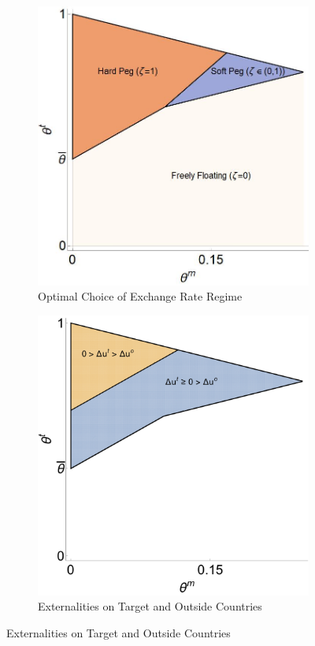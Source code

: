 \begin{figure}
  \begin{minipage}{\linewidth}
    \begin{centering}
      \caption{Optimal Stabilizations}\label{fig_optimal}
      \begin{subfigure}{.49\textwidth}
        \caption{Optimal Choice of Exchange Rate Regime}
        \includegraphics[width=\textwidth]{./Figures/Figure_Optimal_Policy_1.jpg}
      \end{subfigure}
      \begin{subfigure}{.49\textwidth}
        \caption{Externalities on Target and Outside Countries}
        \includegraphics[width=\textwidth]{./Figures/Figure_Winners_and_Losers.pdf}

\end{subfigure}
\end{centering}
\end{minipage}
\end{figure}
